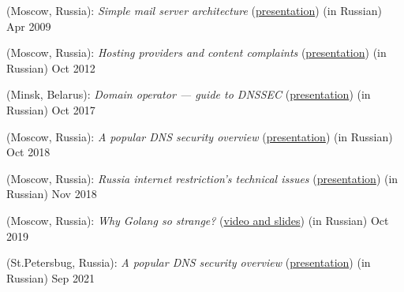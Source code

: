  (Moscow, Russia): \textit{Simple mail server architecture} (\href{https://www.slideshare.net/Dolce727/ss-1278915}{presentation}) (in Russian) \hfill Apr 2009

 (Moscow, Russia): \textit{Hosting providers and content complaints} (\href{https://www.slideshare.net/schors/ss-15356275}{presentation}) (in Russian) \hfill Oct 2012

 (Minsk, Belarus): \textit{Domain operator --- guide to DNSSEC} (\href{https://www.slideshare.net/schors/enog14-dnssec}{presentation}) (in Russian) \hfill Oct 2017

 (Moscow, Russia): \textit{A popular DNS security overview} (\href{https://www.slideshare.net/schors/a-popular-dns-security-overview-modern-theory-and-practice-116166410}{presentation}) (in Russian) \hfill Oct 2018

 (Moscow, Russia): \textit{Russia internet restriction's technical issues} (\href{https://www.slideshare.net/schors/ss-123038251}{presentation}) (in Russian) \hfill Nov 2018

 (Moscow, Russia): \textit{Why Golang so strange?} (\href{https://golangconf.ru/2019/abstracts/5753}{video and slides}) (in Russian) \hfill Oct 2019

 (St.Petersbug, Russia): \textit{A popular DNS security overview} (\href{https://www.slideshare.net/schors/a-popular-dns-security-overview}{presentation}) (in Russian) \hfill Sep 2021

